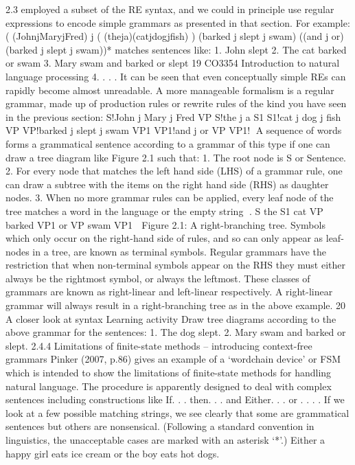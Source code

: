 2.3 employed a subset of the RE syntax, and we could in principle use regular
expressions to encode simple grammars as presented in that section. For example:
( (JohnjMaryjFred) j ( (theja)(catjdogjfish) )
(barked j slept j swam)
((and j or) (barked j slept j swam))*
matches sentences like:
1. John slept
2. The cat barked or swam
3. Mary swam and barked or slept
19
CO3354 Introduction to natural language processing
4. . . .
It can be seen that even conceptually simple REs can rapidly become almost
unreadable. A more manageable formalism is a regular grammar, made up of
production rules or rewrite rules of the kind you have seen in the previous section:
S!John j Mary j Fred VP
S!the j a S1
S1!cat j dog j fish VP
VP!barked j slept j swam VP1
VP1!and j or VP
VP1!
A sequence of words forms a grammatical sentence according to a grammar of this
type if one can draw a tree diagram like Figure 2.1 such that:
1. The root node is S or Sentence.
2. For every node that matches the left hand side (LHS) of a grammar rule, one can
draw a subtree with the items on the right hand side (RHS) as daughter nodes.
3. When no more grammar rules can be applied, every leaf node of the tree
matches a word in the language or the empty string .
S
the
S1
cat
VP
barked
VP1
or
VP
swam
VP1

Figure 2.1: A right-branching tree.
Symbols which only occur on the right-hand side of rules, and so can only appear as
leaf-nodes in a tree, are known as terminal symbols. Regular grammars have the
restriction that when non-terminal symbols appear on the RHS they must either
always be the rightmost symbol, or always the leftmost. These classes of grammars
are known as right-linear and left-linear respectively. A right-linear grammar will
always result in a right-branching tree as in the above example.
20
A closer look at syntax
Learning activity
Draw tree diagrams according to the above grammar for the sentences:
1. The dog slept.
2. Mary swam and barked or slept.
2.4.4 Limitations of finite-state methods – introducing context-free grammars
Pinker (2007, p.86) gives an example of a ‘wordchain device’ or FSM which is
intended to show the limitations of finite-state methods for handling natural
language. The procedure is apparently designed to deal with complex sentences
including constructions like If. . . then. . . and Either. . . or . . . . If we look at a few
possible matching strings, we see clearly that some are grammatical sentences but
others are nonsensical. (Following a standard convention in linguistics, the
unacceptable cases are marked with an asterisk ‘*’.)
Either a happy girl eats ice cream or the boy eats hot dogs.
